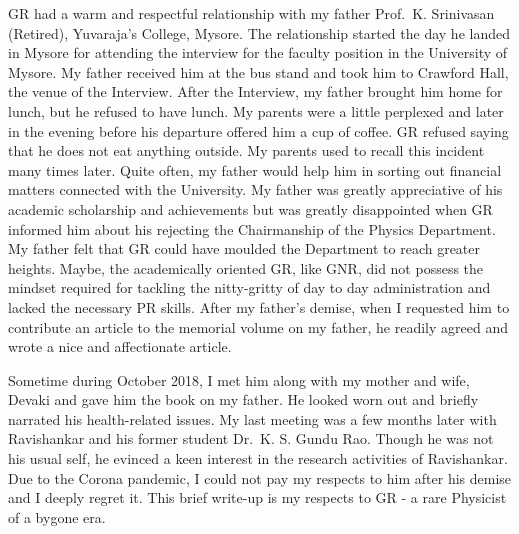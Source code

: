 GR had a warm and respectful relationship with my father Prof.\ K. Srinivasan (Retired), Yuvaraja's College, Mysore. The relationship started the day he landed in Mysore for attending the interview for the faculty position in the University of Mysore. My father received him at the bus stand and took him to Crawford Hall, the venue of the Interview. After the Interview, my father brought him home for lunch, but he refused to have lunch. My parents were a little perplexed and later in the evening before his departure offered him a cup of coffee.  GR refused saying that he does not eat anything outside. My parents used to recall this incident many times later. Quite often, my father would help him in sorting out financial matters connected with the University. My father was greatly appreciative of his academic scholarship and achievements but was greatly disappointed when GR informed him about his rejecting the Chairmanship of the Physics Department. My father felt that GR could have moulded the Department to reach greater heights.  Maybe, the academically oriented GR, like GNR, did not possess the mindset required for tackling the nitty-gritty of day to day administration and lacked the necessary PR skills. After my father’s demise, when I requested him to contribute an article to the memorial volume on my father, he readily agreed and wrote a nice and affectionate article.

Sometime during October 2018, I met him along with my mother and wife, Devaki and gave him the book on my father. He looked worn out and briefly narrated his health-related issues. My last meeting was a few months later with Ravishankar and his former student Dr.\ K. S. Gundu Rao. Though he was not his usual self, he evinced a keen interest in the research activities of Ravishankar. Due to the Corona pandemic, I could not pay my respects to him after his demise and I deeply regret it. This brief write-up is my respects to GR - a rare Physicist of a bygone era.
\vspace{.2cm}

